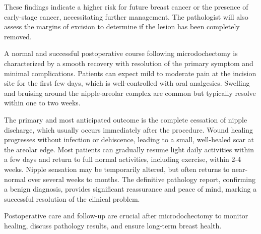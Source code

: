 These findings indicate a higher risk for future breast cancer or the presence of early-stage cancer, necessitating further management. The pathologist will also assess the margins of excision to determine if the lesion has been completely removed.

A normal and successful postoperative course following microdochectomy is characterized by a smooth recovery with resolution of the primary symptom and minimal complications. Patients can expect mild to moderate pain at the incision site for the first few days, which is well-controlled with oral analgesics. Swelling and bruising around the nipple-areolar complex are common but typically resolve within one to two weeks. 

The primary and most anticipated outcome is the complete cessation of nipple discharge, which usually occurs immediately after the procedure. Wound healing progresses without infection or dehiscence, leading to a small, well-healed scar at the areolar edge. Most patients can gradually resume light daily activities within a few days and return to full normal activities, including exercise, within 2-4 weeks. Nipple sensation may be temporarily altered, but often returns to near-normal over several weeks to months. The definitive pathology report, confirming a benign diagnosis, provides significant reassurance and peace of mind, marking a successful resolution of the clinical problem.

Postoperative care and follow-up are crucial after microdochectomy to monitor healing, discuss pathology results, and ensure long-term breast health.

